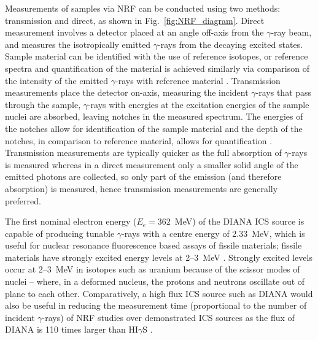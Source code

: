 \documentclass[../main.tex]{subfiles}
\begin{document}
Measurements of samples via NRF can be conducted using two methods: transmission and direct, as shown in Fig.~\ref{fig:NRF_diagram}. Direct measurement involves a detector placed at an angle off-axis from the $\gamma$-ray beam, and measures the isotropically emitted $\gamma$-rays from the decaying excited states. Sample material can be identified with the use of reference isotopes, or reference spectra and quantification of the material is achieved similarly via comparison of the intensity of the emitted $\gamma$-rays with reference material \cite{angell2015demonstration}. Transmission measurements place the detector on-axis, measuring the incident $\gamma$-rays that pass through the sample, $\gamma$-rays with energies at the excitation energies of the sample nuclei are absorbed, leaving notches in the measured spectrum. The energies of the notches allow for identification of the sample material and the depth of the notches, in comparison to reference material, allows for quantification \cite{pruet2006detecting}. Transmission measurements are typically quicker as the full absorption of $\gamma$-rays is measured whereas in a direct measurement only a smaller solid angle of the emitted photons are collected, so only part of the emission (and therefore absorption) is measured, hence transmission measurements are generally preferred.

The first nominal electron energy ($E_{e} = 362$~\si{\mega\electronvolt}) of the DIANA ICS source is capable of producing tunable $\gamma$-rays with a centre energy of 2.33~\si{\mega\electronvolt}, which is useful for nuclear resonance fluorescence based assays of fissile materials; fissile materials have strongly excited energy levels at 2--3~\si{\mega\electronvolt} \cite{angell2015demonstration}. Strongly excited levels occur at 2--3~\si{\mega\electronvolt} in isotopes such as uranium because of the scissor modes of nuclei \cite{iudice1978new,bohle1984new} -- where, in a deformed nucleus, the protons and neutrons oscillate out of plane to each other. Comparatively, a high flux ICS source such as DIANA would also be useful in reducing the measurement time (proportional to the number of incident $\gamma$-rays) of NRF studies over demonstrated ICS sources as the flux of DIANA is 110 times larger than HI$\gamma$S \cite{weller2009research}.
\end{document}
